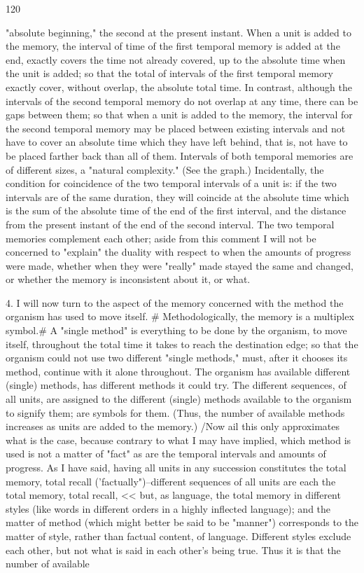 \documentclass[10pt,twoside]{memoir}
\begin{document}
\begin{enumerate}
{{{{{{{{{{{{{{{120 


"absolute beginning," the second at the present instant. When a unit is added 
to the memory, the interval of time of the first temporal memory is added at 
the end, exactly covers the time not already covered, up to the absolute time 
when the unit is added; so that the total of intervals of the first temporal 
memory exactly cover, without overlap, the absolute total time. In contrast, 
although the intervals of the second temporal memory do not overlap at any 
time, there can be gaps between them; so that when a unit is added to the 
memory, the interval for the second temporal memory may be placed 
between existing intervals and not have to cover an absolute time which they 
have left behind, that is, not have to be placed farther back than all of them. 
Intervals of both temporal memories are of different sizes, a "natural 
complexity." (See the graph.) Incidentally, the condition for coincidence of 
the two temporal intervals of a unit is: if the two intervals are of the same 
duration, they will coincide at the absolute time which is the sum of the 
absolute time of the end of the first interval, and the distance from the 
present instant of the end of the second interval. The two temporal 
memories complement each other; aside from this comment I will not be 
concerned to "explain" the duality with respect to when the amounts of 
progress were made, whether when they were "really" made stayed the same 
and changed, or whether the memory is inconsistent about it, or what. 

4. I will now turn to the aspect of the memory concerned with the 
method the organism has used to move itself. # Methodologically, the 
memory is a multiplex symbol.# A "single method" is everything to be done 
by the organism, to move itself, throughout the total time it takes to reach 
the destination edge; so that the organism could not use two different 
"single methods," must, after it chooses its method, continue with it alone 
throughout. The organism has available different (single) methods, has 
different methods it could try. The different sequences, of all units, are 
assigned to the different (single) methods available to the organism to signify 
them; are symbols for them. (Thus, the number of available methods 
increases as units are added to the memory.) /Now ail this only approximates 
what is the case, because contrary to what I may have implied, which 
method is used is not a matter of "fact" as are the temporal intervals and 
amounts of progress. As I have said, having all units in any succession 
constitutes the total memory, total recall ('factually")--different sequences 
of all units are each the total memory, total recall, << but, as language, the 
total memory in different styles (like words in different orders in a highly 
inflected language); and the matter of method (which might better be said to 
be "manner") corresponds to the matter of style, rather than factual 
content, of language. Different styles exclude each other, but not what is 
said in each other's being true. Thus it is that the number of available 


}}}}}}}}}}}}}}}
\end{enumerate}
\end{document}
